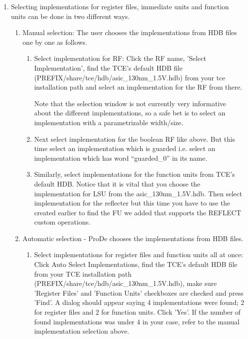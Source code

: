 \documentclass[twoside]{tceusermanual}
\begin{document}
\begin{enumerate}
\item%
Selecting implementations for register files, immediate units and function
units can be done in two different ways.

\begin{enumerate}
\item%
Manual selection: The user chooses the implementations from HDB files one
by one as follows.

\begin{enumerate}
\item%
Select implementation for RF: Click the RF name, 'Select Implementation',
find the TCE's default HDB file (PREFIX/share/tce/hdb/asic\_130nm\_1.5V.hdb) 
from your tce installation path and select an implementation for the RF from 
there.

Note that the selection window is not currently very informative about the
different implementations, so a safe bet is to select an implementation with
a parametrizable width/size.

\item%
Next select implementation for the boolean RF like above. But this time
select an implementation which is guarded i.e. select an implementation which
has word ``guarded\_0'' in its name.

\item%
Similarly, select implementations for the function units from TCE's default
HDB. Notice that it is vital that you choose the implementation for LSU from
the asic\_130nm\_1.5V.hdb. Then select implementation for the reflecter but
this time you have to use the  created earlier to find the FU
we added that supports the REFLECT custom operations.
\end{enumerate}

\item%
Automatic selection - ProDe chooses the implementations from HDB files.

\begin{enumerate}
\item%
Select implementations for register files and function units all at once: 
Click Auto Select Implementations, find the TCE's default HDB file from your 
TCE installation path (PREFIX/share/tce/hdb/asic\_130nm\_1.5V.hdb), make sure
'Register Files' and 'Function Units' checkboxes are checked and press 'Find'.
A dialog should appear saying 4 implementations were found; 2 for register
files and 2 for function units. Click 'Yes'. If the number of found
implementations was under 4 in your case, refer to the manual implementation 
selection above.


\end{enumerate}
\end{enumerate}
\end{enumerate}
\end{document}
